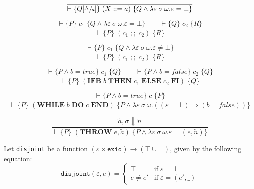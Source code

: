 \begin{equation}\label{eqn:hoare-assign}
\frac{}{\vdash \{Q[\sfrac{X}{a}]\} \; (X ::= a) \; \{Q \wedge \lambda \varepsilon\:\sigma\:\omega. \varepsilon = \bot\}}
\end{equation}

\begin{equation}\label{eqn:hoare-seq}
\frac{\vdash \{P\} \; c_1 \; \{Q \wedge \lambda \varepsilon\:\sigma\:\omega. \varepsilon = \bot\} \qquad \vdash \{Q\} \; c_2 \; \{R\}}{\vdash \{P\} \; (c_1\; ;;\; c_2) \; \{R\}}
\end{equation}

\begin{equation}\label{eqn:hoare-seq-exn}
\frac{\vdash \{P\} \; c_1 \; \{Q \wedge \lambda \varepsilon\:\sigma\:\omega. \varepsilon \neq \bot\}}{\vdash \{P\} \; (c_1\; ;;\; c_2) \; \{R\}}
\end{equation}

\begin{equation}
\frac{\vdash \{P \wedge b=true\} \; c_1 \; \{Q\} \qquad \vdash \{P \wedge b=false\} \; c_2 \; \{Q\}}{\vdash \{P\} \; (\textbf{IFB}\; b\; \textbf{THEN}\; c_1\; \textbf{ELSE}\; c_2\; \textbf{FI}) \; \{Q\}}
\end{equation}

\begin{equation}
\frac{\vdash \{P \wedge b = true\} \; c \; \{P\}}{\vdash \{P\} \; (\textbf{WHILE}\; b\; \textbf{DO}\; c\; \textbf{END}) \; \{P \wedge \lambda \varepsilon\:\sigma\:\omega.((\varepsilon = \bot) \Rightarrow (b = false))\}}
\end{equation}

\begin{equation}\label{eqn:hoare-throw}
\frac{\tilde{a}, \sigma \Downarrow \tilde{n}}{\vdash \{P\} \; (\textbf{THROW}\; e, \tilde{a}) \; \{P \wedge \lambda \varepsilon\:\sigma\:\omega. \varepsilon = (e, \tilde{n})\}}
\end{equation}

\begin{defn}
Let \verb|disjoint| be a function $(\varepsilon\times\texttt{exid})\rightarrow(\top\cup\bot)$, given by the following equation:
\begin{equation}
\texttt{disjoint}(\varepsilon, e) = \begin{cases}
\top & \mbox{if} \; \varepsilon = \bot \\
e \neq e' & \mbox{if} \; \varepsilon = (e', \_)
\end{cases}
\end{equation}
\end{defn}

